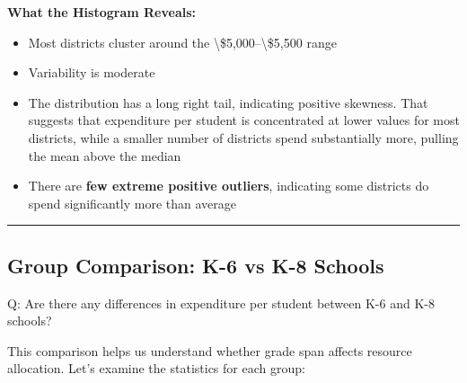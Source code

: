 \documentclass[
  12pt,
  letterpaper,
]{scrbook}
\newenvironment{Shaded}{\begin{snugshade}}{\end{snugshade}}
\newcommand{\AttributeTok}[1]{\textcolor[rgb]{0.40,0.45,0.13}{#1}}
\newcommand{\CommentTok}[1]{\textcolor[rgb]{0.37,0.37,0.37}{#1}}
\newcommand{\ConstantTok}[1]{\textcolor[rgb]{0.56,0.35,0.01}{#1}}
\newcommand{\FunctionTok}[1]{\textcolor[rgb]{0.28,0.35,0.67}{#1}}
\newcommand{\NormalTok}[1]{\textcolor[rgb]{0.00,0.23,0.31}{#1}}
\newcommand{\OtherTok}[1]{\textcolor[rgb]{0.00,0.23,0.31}{#1}}
\newcommand{\SpecialCharTok}[1]{\textcolor[rgb]{0.37,0.37,0.37}{#1}}
\providecommand{\tightlist}{%
  \setlength{\itemsep}{0pt}\setlength{\parskip}{0pt}}
\renewcommand{\tightlist}{\setlength{\itemsep}{0.5\baselineskip}\setlength{\parskip}{0.2\baselineskip}}
\theoremstyle{plain}
\theoremstyle{definition}
\theoremstyle{remark}
\begin{document}
\textbf{What the Histogram Reveals:}

\begin{itemize}
\tightlist
\item
  Most districts cluster around the
  \textbackslash\$5,000--\textbackslash\$5,500 range
\item
  Variability is moderate
\item
  The distribution has a long right tail, indicating positive skewness.
  That suggests that expenditure per student is concentrated at lower
  values for most districts, while a smaller number of districts spend
  substantially more, pulling the mean above the median
\item
  There are \textbf{few extreme positive outliers}, indicating some
  districts do spend significantly more than average
\end{itemize}

\begin{center}\rule{0.5\linewidth}{0.5pt}\end{center}

\subsection{Group Comparison: K-6 vs K-8
Schools}\label{group-comparison-k-6-vs-k-8-schools}

Q: Are there any differences in expenditure per student between K-6 and
K-8 schools?

This comparison helps us understand whether grade span affects resource
allocation. Let's examine the statistics for each group:

\begin{Shaded}
\end{Shaded}
\end{document}
